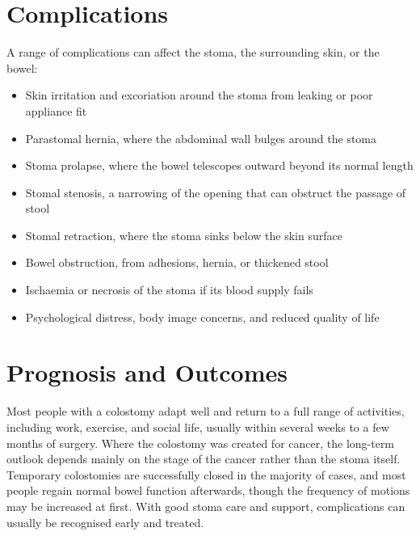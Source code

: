 \section*{Complications}
A range of complications can affect the stoma, the surrounding skin, or the bowel:

\begin{itemize}
    \item Skin irritation and excoriation around the stoma from leaking or poor appliance fit
    \item Parastomal hernia, where the abdominal wall bulges around the stoma
    \item Stoma prolapse, where the bowel telescopes outward beyond its normal length
    \item Stomal stenosis, a narrowing of the opening that can obstruct the passage of stool
    \item Stomal retraction, where the stoma sinks below the skin surface
    \item Bowel obstruction, from adhesions, hernia, or thickened stool
    \item Ischaemia or necrosis of the stoma if its blood supply fails
    \item Psychological distress, body image concerns, and reduced quality of life
\end{itemize}

\section*{Prognosis and Outcomes}
Most people with a colostomy adapt well and return to a full range of activities, including work, exercise, and social life, usually within several weeks to a few months of surgery. Where the colostomy was created for cancer, the long-term outlook depends mainly on the stage of the cancer rather than the stoma itself. Temporary colostomies are successfully closed in the majority of cases, and most people regain normal bowel function afterwards, though the frequency of motions may be increased at first. With good stoma care and support, complications can usually be recognised early and treated.

